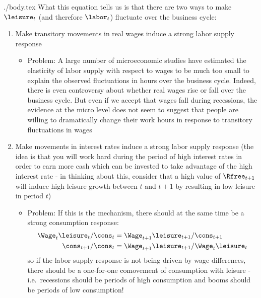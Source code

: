 \documentclass{handout}
\begin{document}
\begin{verbatimwrite}{./body.tex}
What this equation tells us is that there are two ways to make $\leisure_{t}$
(and therefore $\labor_{t}$) fluctuate over the business cycle:
\begin{enumerate}
        \item  Make transitory movements in real wages induce a strong labor supply response
        \begin{itemize}
                \item  Problem:  A large number of microeconomic studies have estimated
the elasticity of labor supply with respect to wages to be much too small to explain
the observed fluctuations in hours over the business cycle.  Indeed, there is even controversy
about whether real wages rise or fall over the business cycle.  But even if we accept that 
wages fall during recessions, the evidence at the micro level does not seem to suggest that people are willing
to dramatically change their work hours in response to transitory fluctuations in wages
        \end{itemize}

        \item Make movements in interest rates induce a strong labor 
        supply response (the idea is that you will work hard during the 
        period of high interest rates in order to earn more cash 
        which can be invested to take advantage of the high interest rate - in thinking about this, 
        consider that a high value of $\Rfree_{t+1}$ will induce high leisure 
        growth between $t$ and $t+1$ by resulting in low leisure in period 
        $t$)
\begin{itemize}
        \item  Problem:  If this is the mechanism, there should at the same time be a strong consumption
        response:
        \begin{equation}\begin{gathered}\begin{aligned}
                \Wage_{t}\leisure_{t}/\cons_{t} & =  \Wage_{t+1}\leisure_{t+1}/\cons_{t+1}  \\
                \cons_{t+1}/\cons_{t} & =  \Wage_{t+1}\leisure_{t+1}/\Wage_{t}\leisure_{t}
        \end{aligned}\end{gathered}\end{equation}
     so if the labor supply response is not being driven by wage differences,
     there should be a one-for-one comovement of consumption with leisure - i.e.\
     recessions should be periods of high consumption and booms should be periods
     of low consumption!


\end{itemize}
\end{enumerate}
\end{verbatimwrite}
\end{document}

